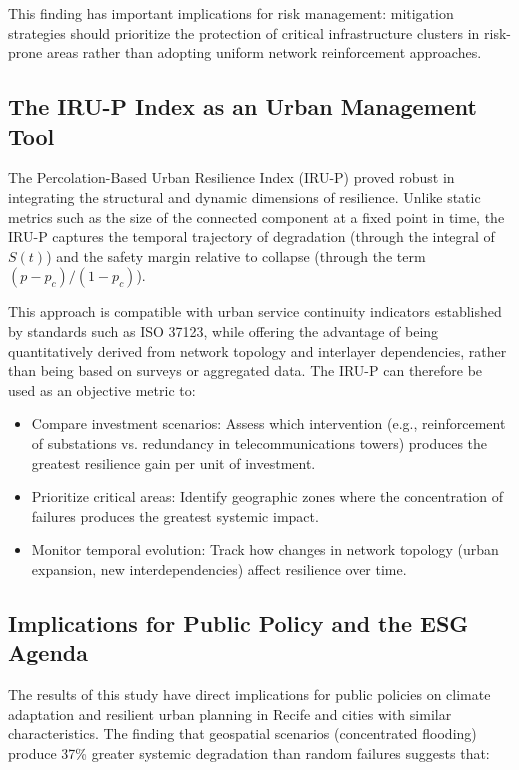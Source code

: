 \documentclass[journal]{IEEEtran}
\begin{document}
This finding has important implications for risk management: mitigation strategies should prioritize the protection of critical infrastructure clusters in risk-prone areas rather than adopting uniform network reinforcement approaches.

\subsection{The IRU-P Index as an Urban Management Tool}
The Percolation-Based Urban Resilience Index (IRU-P) proved robust in integrating the structural and dynamic dimensions of resilience. Unlike static metrics such as the size of the connected component at a fixed point in time, the IRU-P captures the temporal trajectory of degradation (through the integral of $S(t)$) and the safety margin relative to collapse (through the term $(p - p_c)/(1 - p_c)$).

This approach is compatible with urban service continuity indicators established by standards such as ISO 37123, while offering the advantage of being quantitatively derived from network topology and interlayer dependencies, rather than being based on surveys or aggregated data. The IRU-P can therefore be used as an objective metric to:


\begin{itemize}
\item Compare investment scenarios: Assess which intervention (e.g., reinforcement of substations vs. redundancy in telecommunications towers) produces the greatest resilience gain per unit of investment.
\item Prioritize critical areas: Identify geographic zones where the concentration of failures produces the greatest systemic impact.
\item Monitor temporal evolution: Track how changes in network topology (urban expansion, new interdependencies) affect resilience over time.
\end{itemize}


\subsection{Implications for Public Policy and the ESG Agenda}
The results of this study have direct implications for public policies on climate adaptation and resilient urban planning in Recife and cities with similar characteristics. The finding that geospatial scenarios (concentrated flooding) produce 37\% greater systemic degradation than random failures suggests that:
\end{document}
